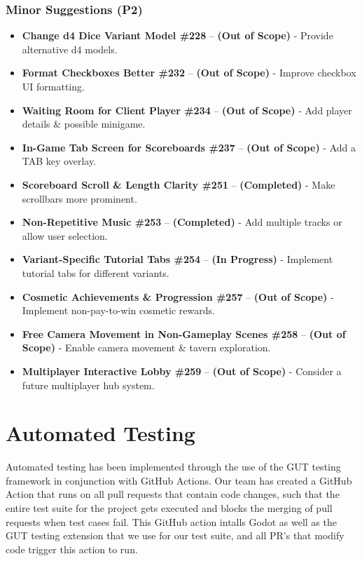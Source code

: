 \documentclass[12pt, titlepage]{article}
\begin{document}
\subsubsection{Minor Suggestions (P2)}
\begin{itemize}
    \item \textbf{Change d4 Dice Variant Model \#228} – \textbf{(Out of Scope)} - Provide alternative d4 models.
    \item \textbf{Format Checkboxes Better \#232} – \textbf{(Out of Scope)} - Improve checkbox UI formatting.
    \item \textbf{Waiting Room for Client Player \#234} – \textbf{(Out of Scope)} - Add player details \& possible minigame.
    \item \textbf{In-Game Tab Screen for Scoreboards \#237} – \textbf{(Out of Scope)} - Add a TAB key overlay.
    \item \textbf{Scoreboard Scroll \& Length Clarity \#251} – \textbf{(Completed)} - Make scrollbars more prominent.
    \item \textbf{Non-Repetitive Music \#253} – \textbf{(Completed)} - Add multiple tracks or allow user selection.
    \item \textbf{Variant-Specific Tutorial Tabs \#254} – \textbf{(In Progress)} - Implement tutorial tabs for different variants.
    \item \textbf{Cosmetic Achievements \& Progression \#257} – \textbf{(Out of Scope)} - Implement non-pay-to-win cosmetic rewards.
    \item \textbf{Free Camera Movement in Non-Gameplay Scenes \#258} – \textbf{(Out of Scope)} - Enable camera movement \& tavern exploration.
    \item \textbf{Multiplayer Interactive Lobby \#259} – \textbf{(Out of Scope)} - Consider a future multiplayer hub system.
\end{itemize}



\newpage
\section{Automated Testing}

Automated testing has been implemented through the use of the GUT testing framework in conjunction with GitHub Actions. Our team has created a GitHub Action that runs on all pull requests that contain code changes, such that the entire test suite for the project gets executed and blocks the merging of pull requests when test cases fail. This GitHub action intalls Godot as well as the GUT testing extension that we use for our test suite, and all PR's that modify code trigger this action to run.
\end{document}
